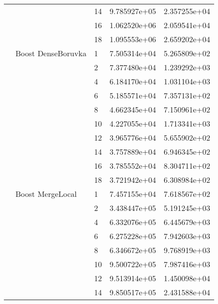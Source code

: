 \begin{tabular}{lllrr}
                      &                     & 14 &  9.785927e+05 &  2.357255e+04 \\
                      &                     & 16 &  1.062520e+06 &  2.059541e+04 \\
                      &                     & 18 &  1.095553e+06 &  2.659202e+04 \\
                      & Boost DenseBoruvka & 1  &  7.505314e+04 &  5.265809e+02 \\
                      &                     & 2  &  7.377480e+04 &  1.239292e+03 \\
                      &                     & 4  &  6.184170e+04 &  1.031104e+03 \\
                      &                     & 6  &  5.185571e+04 &  7.357131e+02 \\
                      &                     & 8  &  4.662345e+04 &  7.150961e+02 \\
                      &                     & 10 &  4.227055e+04 &  1.713341e+03 \\
                      &                     & 12 &  3.965776e+04 &  5.655902e+02 \\
                      &                     & 14 &  3.757889e+04 &  6.946345e+02 \\
                      &                     & 16 &  3.785552e+04 &  8.304711e+02 \\
                      &                     & 18 &  3.721942e+04 &  6.308984e+02 \\
                      & Boost MergeLocal & 1  &  7.457155e+04 &  7.618567e+02 \\
                      &                     & 2  &  3.438447e+05 &  5.191245e+03 \\
                      &                     & 4  &  6.332076e+05 &  6.445679e+03 \\
                      &                     & 6  &  6.275228e+05 &  7.942603e+03 \\
                      &                     & 8  &  6.346672e+05 &  9.768919e+03 \\
                      &                     & 10 &  9.500722e+05 &  7.987416e+03 \\
                      &                     & 12 &  9.513914e+05 &  1.450098e+04 \\
                      &                     & 14 &  9.850517e+05 &  2.431588e+04 \\

\end{tabular}
